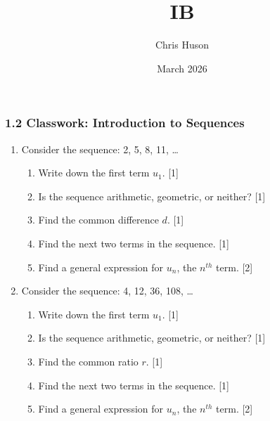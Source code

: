 \documentclass[12pt, twoside]{article}
\title{IB}
\author{Chris Huson}
\date{March 2026}
\begin{document}
\thispagestyle{firstpage}

\subsubsection*{1.2 Classwork: Introduction to Sequences}
\begin{enumerate}[itemsep=0.5cm]
\item Consider the sequence: 2, 5, 8, 11, \ldots
    \begin{enumerate}[itemsep=0.25cm]
        \item Write down the first term $u_1$. \hfill [1]
        \item Is the sequence arithmetic, geometric, or neither? \hfill [1]
        \item Find the common difference $d$. \hfill [1]
        \item Find the next two terms in the sequence. \hfill [1]
        \item Find a general expression for $u_n$, the $n^{th}$ term. \hfill [2]
    \end{enumerate}

\newpage
\item Consider the sequence: 4, 12, 36, 108, \ldots
    \begin{enumerate}[itemsep=0.25cm]
        \item Write down the first term $u_1$. \hfill [1]
        \item Is the sequence arithmetic, geometric, or neither? \hfill [1]
        \item Find the common ratio $r$. \hfill [1]
        \item Find the next two terms in the sequence. \hfill [1]
        \item Find a general expression for $u_n$, the $n^{th}$ term. \hfill [2]
    \end{enumerate}


\end{enumerate}
\end{document}
